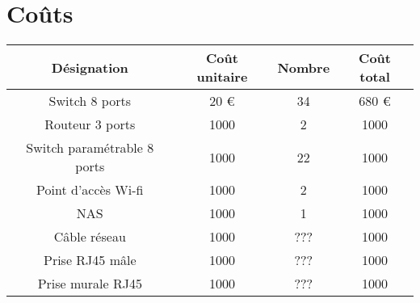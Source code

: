 \documentclass[oneside,10pt]{article}
\begin{document}
\section{Co\^uts}
\begin{tabular}{|c|c|c|c|}
  \hline
  D\'esignation & Co\^ut unitaire & Nombre & Co\^ut total \\
  \hline \hline
  Switch 8 ports & 20 \euro & 34 & 680 \euro \\
  \hline
  Routeur 3 ports & 1000 & 2 & 1000 \\
  \hline
  Switch param\'etrable 8 ports & 1000 & 22 & 1000 \\
  \hline
  Point d'acc\`es Wi-fi & 1000 & 2 & 1000 \\
  \hline
  NAS & 1000 & 1 & 1000 \\
  \hline
  C\^able réseau & 1000 & ??? & 1000 \\
  \hline
  Prise RJ45 mâle & 1000 & ??? & 1000 \\
  \hline
  Prise murale RJ45 & 1000 & ??? & 1000 \\
  \hline
\end{tabular}
\end{document}
